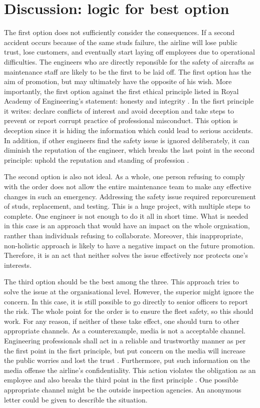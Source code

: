 \documentclass[12pt, a4paper]{article}
\begin{document}
\section{Discussion: logic for best option}
The first option does not sufficiently consider the consequences. If a second accident occurs because of the same studs failure, the airline will lose public trust, lose customers, and eventually start laying off employees due to operational difficulties. The engineers who are directly reponsible for the safety of aircrafts as maintenance staff are likely to be the first to be laid off. The first option has the aim of promotion, but may ultimately have the opposite of his wish. More importantly, the first option against the first ethical principle listed in Royal Academy of Engineering's statement: honesty and integrity \cite{statement-of-ethical-principles}. In the fisrt principle it writes: declare conflicts of interest and avoid deception and take steps to prevent or report corrupt practice of professional misconduct. This option is deception since it is hiding the information which could lead to serious accidents. In addition, if other engineers find the safety issue is ignored deliberately, it can diminish the reputation of the engineer, which breaks the last point in the second principle: uphold the reputation and standing of profession \cite{statement-of-ethical-principles}.

The second option is also not ideal. As a whole, one person refusing to comply with the order does not allow the entire maintenance team to make any effective changes in such an emergency. Addressing the safety issue required reporcurement of studs, replacement, and testing. This is a huge project, with multiple steps to complete. One engineer is not enough to do it all in short time. What is needed in this case is an approach that would have an impact on the whole orgnisation, ranther than individuals refusing to collaborate. Moreover, this inappropriate, non-holistic approach is likely to have a negative impact on the future promotion. Therefore, it is an act that neither solves the issue effectively nor protects one's interests.

The third option should be the best among the three. This approach tries to solve the issue at the organisational level. However, the superior might ignore the concern. In this case, it is still possible to go directly to senior officers to report the risk. The whole point for the order is to ensure the fleet safety, so this should work. For any reason, if neither of these take effect, one should turn to other appropriate channels. As a counterexample, media is not a acceptable channel. Engineering professionals shall act in a reliable and trustworthy manner as per the first point in the fisrt principle, but put concern on the media will increase the public worries and lost the trust \cite{statement-of-ethical-principles}. Furthermore, put such information on the media offense the airline's confidentiality. This action violates the obligation as an employee and also breaks the third point in the first principle \cite{statement-of-ethical-principles}. One possible appropriate channel might be the outside inspection agencies. An anonymous letter could be given to describle the situation.
\end{document}
